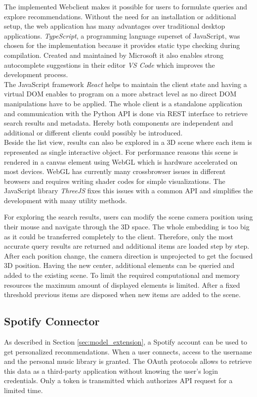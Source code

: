 \documentclass[sigconf]{acmart}
\begin{document}
The implemented Webclient makes it possible for users to formulate queries and explore recommendations. Without the need for an installation or additional setup, the web application has many advantages over traditional desktop applications. \emph{TypeScript}, a programming language superset of JavaScript, was chosen for the implementation because it provides static type checking during compilation. Created and maintained by Microsoft it also enables strong autocomplete suggestions in their editor \emph{VS Code} which improves the development process. \\
The JavaScript framework \emph{React} helps to maintain the client state and having a virtual DOM enables to program on a more abstract level as no direct DOM manipulations have to be applied. The whole client is a standalone application and communication with the Python API is done via REST interface to retrieve search results and metadata. Hereby both components are independent and additional or different clients could possibly be introduced. \\

Beside the list view, results can also be explored in a 3D scene where each item is represented as single interactive object. For performance reasons this scene is rendered in a canvas element using WebGL which is hardware accelerated on most devices. WebGL has currently many crossbrowser issues in different browsers and requires writing shader codes for simple visualizations. The JavaScript library \emph{ThreeJS} fixes this issues with a common API and simplifies the development with many utility methods.

For exploring the search results, users can modify the scene camera position using their mouse and navigate through the 3D space. The whole embedding is too big as it could be transferred completely to the client. Therefore, only the most accurate query results are returned and additional items are loaded step by step. After each position change, the camera direction is unprojected to get the focused 3D position. Having the new center, additional elements can be queried and added to the existing scene. To limit the required computational and memory resources the maximum amount of displayed elements is limited. After a fixed threshold previous items are disposed when new items are added to the scene.

\subsection{Spotify Connector}
As described in Section \ref{sec:model_extension}, a Spotify account can be used to get personalized recommendations. When a user connects, access to the username and the personal music library is granted. The OAuth protocols allows to retrieve this data as a third-party application without knowing the user’s login credentials. Only a token is transmitted which authorizes API request for a limited time.
\end{document}

